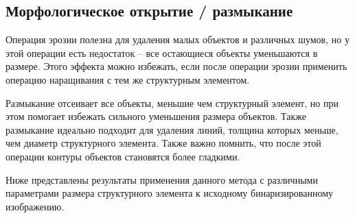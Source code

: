 \begin{figure}[H]
	\begin{minipage}[h]{0.49\linewidth}
	\end{minipage}
	\hfill
	\begin{minipage}[h]{0.49\linewidth}
	\end{minipage}
	\vfill
	\begin{minipage}[h]{0.49\linewidth}
	\end{minipage}
	\hfill
	\begin{minipage}[h]{0.49\linewidth}
	\end{minipage}
\end{figure}

\newpage

\subsection{Морфологическое открытие / размыкание}

Операция эрозии полезна для удаления малых объектов и различных шумов, но у этой операции есть недостаток – все остающиеся объекты уменьшаются в размере. Этого эффекта можно избежать, если после операции эрозии применить операцию наращивания с тем же структурным элементом.

Размыкание отсеивает все объекты, меньшие чем структурный элемент, но при этом помогает избежать сильного уменьшения размера объектов. Также размыкание идеально подходит для удаления линий, толщина которых меньше, чем диаметр структурного элемента. Также важно помнить, что после этой операции контуры объектов становятся более гладкими.

Ниже представлены результаты применения данного метода с различными параметрами размера структурного элемента к исходному бинаризированному изображению.

